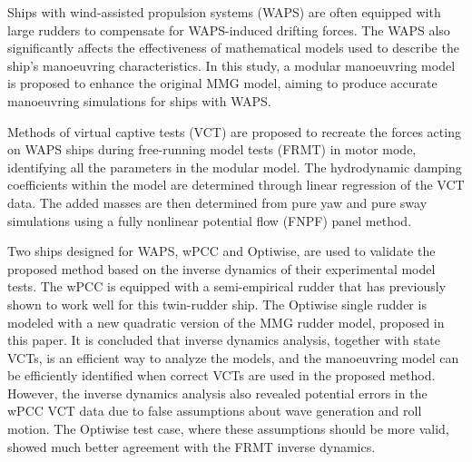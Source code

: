 Ships with wind-assisted propulsion systems (WAPS) are often equipped with large rudders to compensate for WAPS-induced drifting forces. The WAPS also significantly affects the effectiveness of mathematical models used to describe the ship's manoeuvring characteristics. In this study, a modular manoeuvring model is proposed to enhance the original MMG model, aiming to produce accurate manoeuvring simulations for ships with WAPS.

Methods of virtual captive tests (VCT) are proposed to recreate the forces acting on WAPS ships during free-running model tests (FRMT) in motor mode, identifying all the parameters in the modular model. The hydrodynamic damping coefficients within the model are determined through linear regression of the VCT data. The added masses are then determined from pure yaw and pure sway simulations using a fully nonlinear potential flow (FNPF) panel method.

Two ships designed for WAPS, wPCC and Optiwise, are used to validate the proposed method based on the inverse dynamics of their experimental model tests. The wPCC is equipped with a semi-empirical rudder that has previously shown to work well for this twin-rudder ship. The Optiwise single rudder is modeled with a new quadratic version of the MMG rudder model, proposed in this paper. It is concluded that inverse dynamics analysis, together with state VCTs, is an efficient way to analyze the models, and the manoeuvring model can be efficiently identified when correct VCTs are used in the proposed method. However, the inverse dynamics analysis also revealed potential errors in the wPCC VCT data due to false assumptions about wave generation and roll motion. The Optiwise test case, where these assumptions should be more valid, showed much better agreement with the FRMT inverse dynamics.


%    

